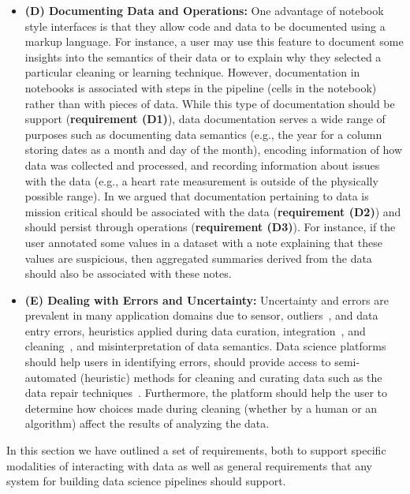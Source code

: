 \begin{itemize}
\item \textbf{(D) Documenting Data and Operations:} One advantage of notebook style interfaces is that they allow code and data to be documented using a markup language. For instance, a user may use this feature to document some insights into the semantics of their data or to explain why they selected a particular cleaning or learning technique. However, documentation in notebooks is associated with steps in the pipeline (cells in the notebook) rather than with pieces of data. While this type of documentation should be support (\textbf{requirement (D1)}), data documentation serves a wide range of purposes such as documenting data semantics (e.g., the year for a column storing dates as a month and day of the month), encoding information of how data was collected and processed, and recording information about issues with the data (e.g., a heart rate measurement is outside of the physically possible range). In \cite{kumari:2021:cidr:datasense} we argued that documentation pertaining to data is mission critical should be associated with the data (\textbf{requirement (D2)}) and should persist through operations (\textbf{requirement (D3)}). For instance, if the user annotated some values in a dataset with a note explaining that these values are suspicious, then aggregated summaries derived from the data should also be associated with these notes.
\item \textbf{(E) Dealing with Errors and Uncertainty:} Uncertainty and errors are prevalent in many application domains due to sensor, outliers~\cite{HA04}, and data entry errors, heuristics applied during data curation, integration~\cite{AS10, FK11b}, and cleaning~\cite{YM15, BS10a}, and misinterpretation of data semantics. Data science platforms should help users in identifying errors, should provide access to semi-automated (heuristic) methods for cleaning and curating data such as the data repair techniques~\cite{B19, ilyas-15-tcrd}. Furthermore, the platform should help the user to determine how choices made during cleaning (whether by a human or an algorithm) affect the results of analyzing the data.
\end{itemize}

In this section we have outlined a set of requirements, both to support specific modalities of interacting with data as well as general requirements that any system for building data science pipelines should support.


